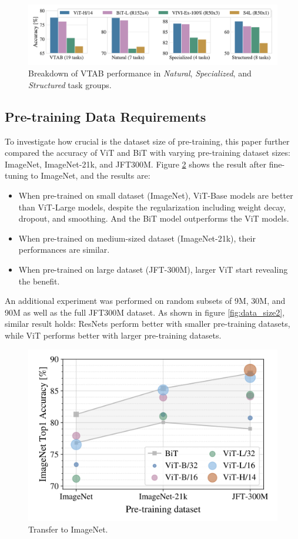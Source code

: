 \documentclass[12pt]{article}
\begin{document}
\begin{figure}
    \centering
    \includegraphics[width=1\linewidth]{images/acc_cmp2.png}
    \caption{Breakdown of VTAB performance in \textit{Natural}, \textit{Specialized}, and \textit{Structured} task groups.}
    \label{fig:acc_cmp2}
\end{figure}


\subsection{Pre-training Data Requirements}

To investigate how crucial is the dataset size of pre-training, this paper further compared the accuracy of ViT and BiT with varying pre-training dataset sizes: ImageNet, ImageNet-21k, and JFT300M. Figure \ref{fig:data_size1} shows the result after fine-tuning to ImageNet, and the results are:

\begin{itemize}
    \item When pre-trained on small dataset (ImageNet), ViT-Base models are better than ViT-Large models, despite the regularization including weight decay, dropout, and smoothing. And the BiT model outperforms the ViT models.
    \item When pre-trained on medium-sized dataset (ImageNet-21k), their performances are similar.
    \item When pre-trained on large dataset (JFT-300M), larger ViT start revealing the benefit.
\end{itemize}

An additional experiment was performed on random subsets of 9M, 30M, and 90M as well as the full JFT300M dataset. As shown in figure \ref{fig:data_size2}, similar result holds: ResNets perform better with smaller pre-training datasets, while ViT performs better with larger pre-training datasets.

\begin{figure}
    \centering
    \includegraphics[width=0.7\linewidth]{images/data_size1.png}
    \caption{Transfer to ImageNet.}
    \label{fig:data_size1}
\end{figure}
\end{document}

